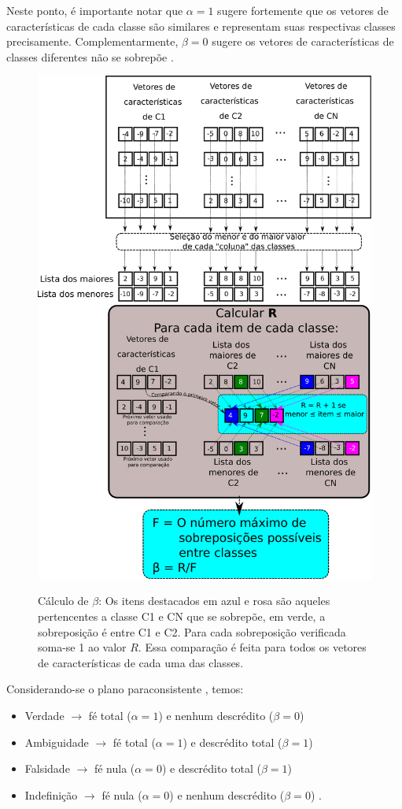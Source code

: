			\par Neste ponto, é importante notar que $\alpha=1$ sugere fortemente que os vetores de características de cada classe são similares e representam suas respectivas classes precisamente. Complementarmente, $\beta=0$ sugere os vetores de características de classes diferentes não se sobrepõe \cite{8588433}.
			
			\begin{figure}[h]
				\centering
				\caption[Cálculo de $\beta$]{Cálculo de $\beta$: Os itens destacados em azul e rosa são aqueles pertencentes a classe C1 e CN que se sobrepõe, em verde, a sobreposição é entre C1 e C2. Para cada sobreposição verificada soma-se 1 ao valor $R$. Essa comparação é feita para todos os vetores de características de cada uma das classes.}
				\includegraphics[width=0.5\linewidth]{images/betaCalculation.pdf}
				\label{fig:betacalculation}
			\end{figure}
			
			\par Considerando-se o plano paraconsistente \cite{8588433}, temos: 
			
			\begin{itemize}
				\item Verdade $\rightarrow$ fé total ($\alpha = 1$) e nenhum descrédito ($\beta = 0$)
				\item Ambiguidade $\rightarrow$ fé total ($\alpha = 1$) e descrédito total ($\beta = 1$)
				\item Falsidade $\rightarrow$ fé nula ($\alpha = 0$) e descrédito total ($\beta = 1$)
				\item Indefinição $\rightarrow$ fé nula ($\alpha = 0$) e nenhum descrédito ($\beta = 0$) \qquad.
			\end{itemize}
	
